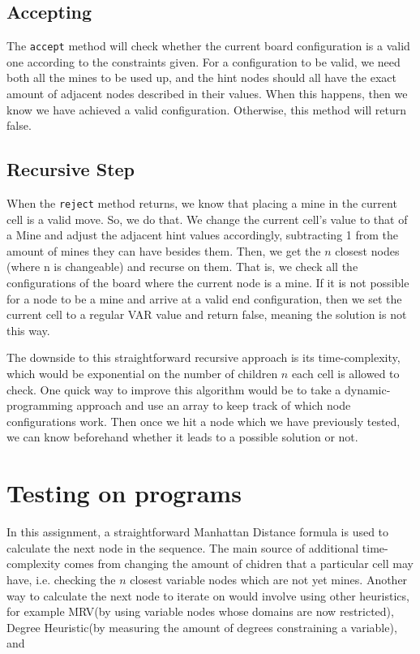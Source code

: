 \documentclass{article}
\begin{document}
\subsection{Accepting}
The \texttt{accept} method will check whether the current board configuration is a valid one according to the 
constraints given. For a configuration to be valid, we need both all the mines to be used up, and the hint nodes
should all have the exact amount of adjacent nodes described in their values. When this happens, then we know 
we have achieved a valid configuration. Otherwise, this method will return false.

\subsection{Recursive Step}
When the \texttt{reject} method returns, we know that placing a mine in the current cell is a valid move. So, we do that.
We change the current cell's value to that of a Mine and adjust the adjacent hint values accordingly, subtracting 1 from the 
amount of mines they can have besides them. Then, we get the $n$ closest nodes (where n is changeable) and recurse on them.
That is, we check all the configurations of the board where the current node is a mine. If it is not possible for a node to be 
a mine and arrive at a valid end configuration, then we set the current cell to a regular VAR value and return false, meaning the 
solution is not this way. 

The downside to this straightforward recursive approach is its time-complexity, which would be exponential
on the number of children $n$ each cell is allowed to check. One quick way to improve this algorithm would be to take a dynamic-
programming approach and use an array to keep track of which node configurations work. Then once we hit a node which we have previously
tested, we can know beforehand whether it leads to a possible solution or not.

\section{Testing on programs}
In this assignment, a straightforward Manhattan Distance formula is used to calculate the next node in the sequence.
The main source of additional time-complexity comes from changing the amount of chidren that a particular cell may 
have, i.e. checking the $n$ closest variable nodes which are not yet mines. Another way to calculate the next node to iterate on
would involve using other heuristics, for example MRV(by using variable nodes whose domains are now restricted),
Degree Heuristic(by measuring the amount of degrees constraining a variable), and 
\end{document}
